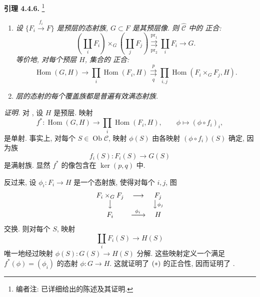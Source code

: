 
\setcounter{footnote}{33}

\medskip
\noindent{}\textbf{引理 4.4.6.}
\footnote{编者注: 已详细给出的陈述及其证明.}
\begin{enumerate}
  \item[(i)]
    \textit{设 \(\{F_i\xrightarrow{f_i}F\}\) 是预层的态射族,
    \(G\subset F\) 是其预层像. 则 \(\widehat{\mathscr C}\) 中的
    正合:}
    \[
      \left(\coprod_i F_i\right)\times_G
      \left(\coprod_j F_j\right)
      \overset{\operatorname{pr}_1}
        {\underset{\operatorname{pr}_2}{\rightrightarrows}}
      \coprod_i F_i\longrightarrow G.
    \]
    \textit{等价地, 对每个预层 \(H\), 集合的
    正合:}
    \[
    \tag{*}\label{sga3:iv:lemma:4:4:6:eq:unnamed:01}
      \operatorname{Hom}(G,H)
      \longrightarrow
      \prod_i\operatorname{Hom}(F_i,H)
      \overset{p}{\underset{q}{\rightrightarrows}}
      \prod_{i,j}\operatorname{Hom}(F_i\times_G F_j,H).
    \]

  \item[(ii)]
    \textit{层的态射的每个覆盖族都是普遍有效满态射族.}
\end{enumerate}

\noindent\textit{证明.}
对 , 设 \(H\) 是预层. 映射
\[
  f^*:\operatorname{Hom}(G,H)
  \longrightarrow\prod_i\operatorname{Hom}(F_i,H),
  \qquad
  \phi\longmapsto(\phi\circ f_i)_i,
\]
是单射. 事实上, 对每个 \(S\in\operatorname{Ob}\mathscr C\),
映射 \(\phi(S)\) 由各映射 \((\phi\circ f_i)(S)\) 确定, 因为族
\[
  f_i(S):F_i(S)\longrightarrow G(S)
\]
是满射族. 显然 \(f^*\) 的像包含在 \(\ker(p,q)\) 中.

反过来, 设 \(\phi_i:F_i\to H\) 是一个态射族,
使得对每个 \(i,j\), 图
\[
\begin{array}{ccc}
  F_i\times_G F_j&\longrightarrow&F_j\\
  \big\downarrow&&\big\downarrow{\scriptstyle\phi_j}\\
  F_i&\xrightarrow{\ \phi_i\ }&H
\end{array}
\]
交换. 则对每个 \(S\), 映射
\[
  \coprod_i F_i(S)\longrightarrow H(S)
\]
唯一地经过映射 \(\phi(S):G(S)\to H(S)\) 分解.
这些映射定义一个满足 \(f^*(\phi)=(\phi_i)\) 的态射 \(\phi:G\to H\).
这就证明了 \(\SGARefLink{sga3:iv:lemma:4:4:6:eq:unnamed:01}{(*)}\)
的正合性, 因而证明了 .


